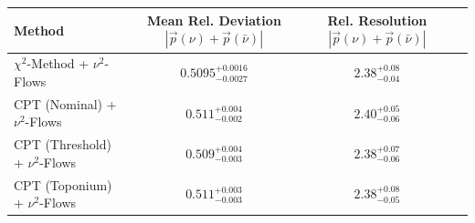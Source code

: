     \begin{tabular}{lccc}
        \toprule
        Method & Mean Rel. Deviation $|\vec{p}(\nu) + \vec{p}(\bar{\nu})|$ & Rel. Resolution $|\vec{p}(\nu) + \vec{p}(\bar{\nu})|$ \\
        \midrule
        $\chi^2$-Method + $\nu^2$-Flows & $0.5095^{+0.0016}_{-0.0027}$ & $2.38^{+0.08}_{-0.04}$ \\
        CPT (Nominal) + $\nu^2$-Flows & $0.511^{+0.004}_{-0.002}$ & $2.40^{+0.05}_{-0.06}$ \\
        CPT (Threshold) + $\nu^2$-Flows & $0.509^{+0.004}_{-0.003}$ & $2.38^{+0.07}_{-0.06}$ \\
        CPT (Toponium) + $\nu^2$-Flows & $0.511^{+0.003}_{-0.003}$ & $2.38^{+0.08}_{-0.05}$ \\
        \bottomrule
    \end{tabular}
